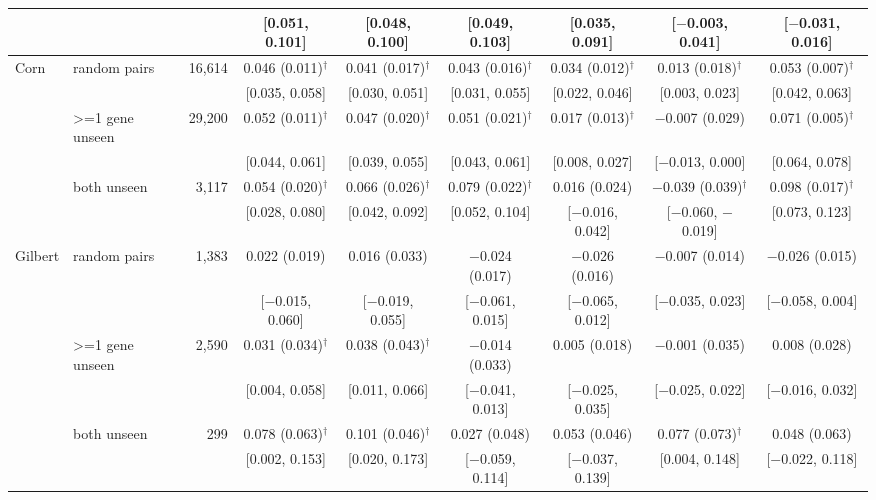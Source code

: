 \begin{tabular}{llr|cccccc}
 & & & \scriptsize[0.051, 0.101] & \scriptsize[0.048, 0.100] & \scriptsize[0.049, 0.103] & \scriptsize[0.035, 0.091] & \scriptsize[$-$0.003, 0.041] & \scriptsize[$-$0.031, 0.016] \\
\hline
Corn & random pairs & 16,614 & 0.046 (0.011)$^\dagger$ & 0.041 (0.017)$^\dagger$ & 0.043 (0.016)$^\dagger$ & 0.034 (0.012)$^\dagger$ & 0.013 (0.018)$^\dagger$ & 0.053 (0.007)$^\dagger$ \\
 & & & \scriptsize[0.035, 0.058] & \scriptsize[0.030, 0.051] & \scriptsize[0.031, 0.055] & \scriptsize[0.022, 0.046] & \scriptsize[0.003, 0.023] & \scriptsize[0.042, 0.063] \\
 & >=1 gene unseen & 29,200 & 0.052 (0.011)$^\dagger$ & 0.047 (0.020)$^\dagger$ & 0.051 (0.021)$^\dagger$ & 0.017 (0.013)$^\dagger$ & $-$0.007 (0.029) & 0.071 (0.005)$^\dagger$ \\
 & & & \scriptsize[0.044, 0.061] & \scriptsize[0.039, 0.055] & \scriptsize[0.043, 0.061] & \scriptsize[0.008, 0.027] & \scriptsize[$-$0.013, 0.000] & \scriptsize[0.064, 0.078] \\
 & both unseen & 3,117 & 0.054 (0.020)$^\dagger$ & 0.066 (0.026)$^\dagger$ & 0.079 (0.022)$^\dagger$ & 0.016 (0.024) & $-$0.039 (0.039)$^\dagger$ & 0.098 (0.017)$^\dagger$ \\
 & & & \scriptsize[0.028, 0.080] & \scriptsize[0.042, 0.092] & \scriptsize[0.052, 0.104] & \scriptsize[$-$0.016, 0.042] & \scriptsize[$-$0.060, $-$0.019] & \scriptsize[0.073, 0.123] \\
\hline
Gilbert & random pairs & 1,383 & 0.022 (0.019) & 0.016 (0.033) & $-$0.024 (0.017) & $-$0.026 (0.016) & $-$0.007 (0.014) & $-$0.026 (0.015) \\
 & & & \scriptsize[$-$0.015, 0.060] & \scriptsize[$-$0.019, 0.055] & \scriptsize[$-$0.061, 0.015] & \scriptsize[$-$0.065, 0.012] & \scriptsize[$-$0.035, 0.023] & \scriptsize[$-$0.058, 0.004] \\
 & >=1 gene unseen & 2,590 & 0.031 (0.034)$^\dagger$ & 0.038 (0.043)$^\dagger$ & $-$0.014 (0.033) & 0.005 (0.018) & $-$0.001 (0.035) & 0.008 (0.028) \\
 & & & \scriptsize[0.004, 0.058] & \scriptsize[0.011, 0.066] & \scriptsize[$-$0.041, 0.013] & \scriptsize[$-$0.025, 0.035] & \scriptsize[$-$0.025, 0.022] & \scriptsize[$-$0.016, 0.032] \\
 & both unseen & 299 & 0.078 (0.063)$^\dagger$ & 0.101 (0.046)$^\dagger$ & 0.027 (0.048) & 0.053 (0.046) & 0.077 (0.073)$^\dagger$ & 0.048 (0.063) \\
 & & & \scriptsize[0.002, 0.153] & \scriptsize[0.020, 0.173] & \scriptsize[$-$0.059, 0.114] & \scriptsize[$-$0.037, 0.139] & \scriptsize[0.004, 0.148] & \scriptsize[$-$0.022, 0.118] \\
\hline
\end{tabular}